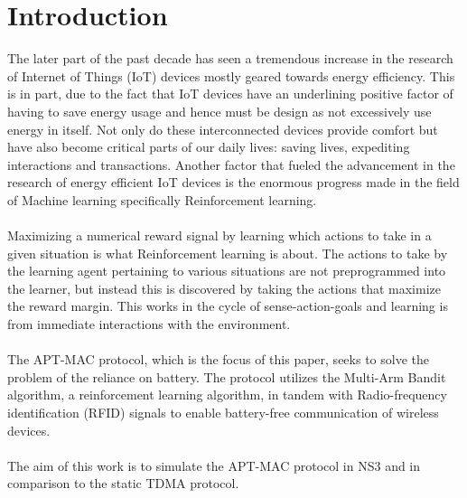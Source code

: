 \chapter{Introduction}

The later part of the past decade has seen a tremendous increase in the research of Internet of Things (IoT) devices mostly geared towards energy efficiency.
This is in part, due to the fact that IoT devices have an underlining positive factor of having to save energy usage and hence must be design as not excessively use energy in itself.
Not only do these interconnected devices provide comfort but have also become critical parts of our daily lives: saving lives, expediting interactions and transactions.
Another factor that fueled the advancement in the research of energy efficient IoT devices is the enormous progress made in the field of Machine learning specifically Reinforcement learning.\\\\
Maximizing a numerical reward signal by learning which actions to take in a given situation is what Reinforcement learning is about.
The actions to take by the learning agent pertaining to various situations are not preprogrammed into the learner, but instead this is discovered by taking the actions that maximize the reward margin\cite{Sutton&Barto}. This works in the cycle of sense-action-goals and learning is from immediate interactions with the environment.\\\\
The APT-MAC protocol, which is the focus of this paper, seeks to solve the problem of the reliance on battery.
The protocol utilizes the Multi-Arm Bandit algorithm, a reinforcement learning algorithm, in tandem with Radio-frequency identification (RFID) signals to enable battery-free communication of wireless devices\cite{Maselli}.\\\\
The aim of this work is to simulate the APT-MAC protocol in NS3 and in comparison to the static TDMA protocol.

